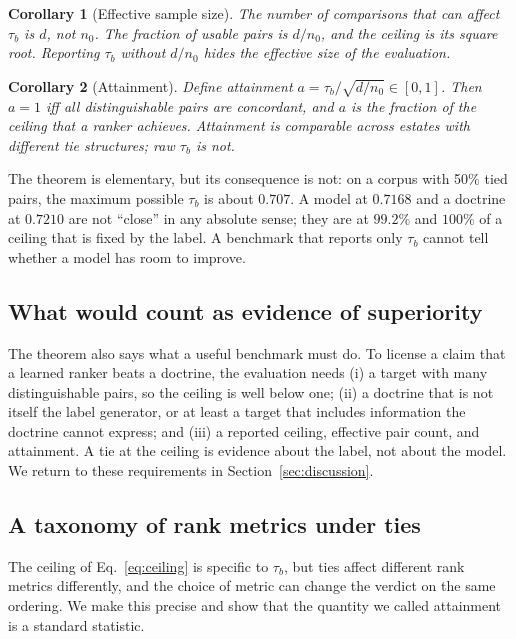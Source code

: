 \documentclass[conference,10pt]{IEEEtran}
\newtheorem{corollary}{Corollary}
\newcommand{\tb}{\tau_b}
\newcommand{\distinct}{d}
\newcommand{\nzero}{n_0}
\begin{document}
\begin{corollary}[Effective sample size]
The number of comparisons that can affect $\tb$ is $\distinct$, not $\nzero$. The fraction of
usable pairs is $\distinct/\nzero$, and the ceiling is its square root. Reporting $\tb$ without
$\distinct/\nzero$ hides the effective size of the evaluation.
\end{corollary}

\begin{corollary}[Attainment]
Define attainment $a=\tb/\sqrt{\distinct/\nzero}\in[0,1]$. Then $a=1$ iff all distinguishable
pairs are concordant, and $a$ is the fraction of the ceiling that a ranker achieves. Attainment
is comparable across estates with different tie structures; raw $\tb$ is not.
\end{corollary}

The theorem is elementary, but its consequence is not: on a corpus with 50\% tied pairs, the
maximum possible $\tb$ is about $0.707$. A model at $0.7168$ and a doctrine at $0.7210$ are not
``close'' in any absolute sense; they are at $99.2\%$ and $100\%$ of a ceiling that is fixed by
the label. A benchmark that reports only $\tb$ cannot tell whether a model has room to improve.

\subsection{What would count as evidence of superiority}
The theorem also says what a useful benchmark must do. To license a claim that a learned ranker
beats a doctrine, the evaluation needs (i) a target with many distinguishable pairs, so the
ceiling is well below one; (ii) a doctrine that is not itself the label generator, or at least a
target that includes information the doctrine cannot express; and (iii) a reported ceiling,
effective pair count, and attainment. A tie at the ceiling is evidence about the label, not
about the model. We return to these requirements in Section~\ref{sec:discussion}.

\subsection{A taxonomy of rank metrics under ties}
\label{sec:taxonomy}

The ceiling of Eq.~\eqref{eq:ceiling} is specific to $\tb$, but ties affect different rank
metrics differently, and the choice of metric can change the verdict on the same ordering. We
make this precise and show that the quantity we called attainment is a standard statistic.
\end{document}
